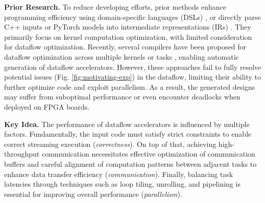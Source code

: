\documentclass[conference]{IEEEtran}
\begin{document}
\textbf{Prior Research.} To reduce developing efforts, prior methods 
enhance programming efficiency using domain-specific languages (DSLs) \cite{lai2019heterocl, xiang2022heteroflow, zhang2024pom}, or directly parse C++ inputs or PyTorch models into intermediate representations (IRs) \cite{ye2022scalehls, huang2021pylog, 2022fplpolsca}.
They primarily focus on kernel computation optimization, with limited consideration for dataflow optimization. Recently, several compilers have been proposed for dataflow optimization across multiple kernels or tasks \cite{ye2024hida, chen2024allo, streamhlsFPGA25, streamtensorMICRO25}, enabling automatic generation of dataflow accelerators.
However, these approaches fail to fully resolve potential issues (Fig. \ref{fig:motivating-exp}) in the dataflow,
limiting their ability to further optimize code and exploit parallelism. As a result, the generated designs may suffer from suboptimal performance or even encounter deadlocks when deployed on FPGA boards. 

\textbf{Key Idea.} 
The performance of dataflow accelerators is influenced by multiple factors. Fundamentally, the input code must satisfy strict constraints to enable correct streaming execution (\textit{correctness}). On top of that, achieving high-throughput communication necessitates effective optimization of communication buffers and careful alignment of computation patterns between adjacent tasks to enhance data transfer efficiency (\textit{communication}). 
Finally, balancing task latencies through techniques such as loop tiling, unrolling, and pipelining is essential for improving overall performance (\textit{parallelism}). 
\end{document}
